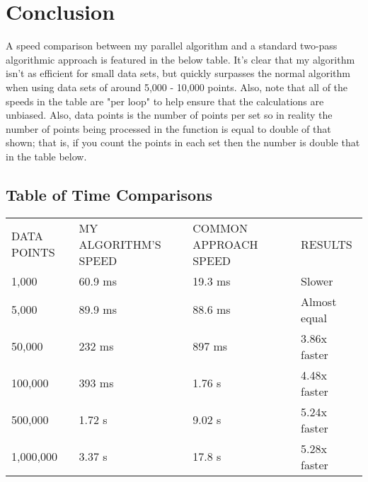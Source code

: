 \documentclass{article}
\begin{document}
 \section{Conclusion}
A speed comparison between my parallel algorithm and a standard two-pass algorithmic approach is featured in the below table. It's clear that my algorithm isn't as efficient for small data sets, but quickly surpasses the normal algorithm when using data sets of around 5,000 - 10,000 points. Also, note that all of the speeds in the table are "per loop" to help ensure that the calculations are unbiased. Also, data points is the number of points per set so in reality the number of points being processed in the function is equal to double of that shown; that is, if you count the points in each set then the number is double that in the table below.
    \subsection{Table of Time Comparisons}
\begin{table}[h]
\begin{tabular}{llll}
DATA POINTS& MY ALGORITHM'S SPEED& COMMON APPROACH SPEED & RESULTS \\
1,000 & 60.9 ms& 19.3 ms & Slower \\
5,000 & 89.9 ms& 88.6 ms & Almost equal \\
50,000 & 232 ms& 897 ms & 3.86x faster \\
100,000 & 393 ms& 1.76 s & 4.48x faster \\
500,000 & 1.72 s& 9.02 s & 5.24x faster \\
1,000,000 & 3.37 s& 17.8 s & 5.28x faster
\end{tabular}
\end{table}


\newpage


\end{document}
